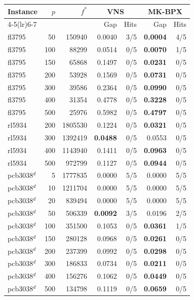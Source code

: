 \begin{tabular}{lrrrrrr}
\toprule
Instance & $p$ & $f^*$ & \multicolumn{2}{c}{VNS} & \multicolumn{2}{c}{MK-BPX} \\
\cmidrule(lr){4-5}\cmidrule(lr){6-7}
 & &  & Gap & Hits & Gap & Hits \\
\midrule
fl3795 & 50 & 150940 & 0.0040 & 3/5 & \textbf{0.0004} & 4/5 \\
fl3795 & 100 & 88299 & 0.0514 & 0/5 & \textbf{0.0070} & 1/5 \\
fl3795 & 150 & 65868 & 0.1497 & 0/5 & \textbf{0.0231} & 0/5 \\
fl3795 & 200 & 53928 & 0.1569 & 0/5 & \textbf{0.0731} & 0/5 \\
fl3795 & 300 & 39586 & 0.2364 & 0/5 & \textbf{0.0990} & 0/5 \\
fl3795 & 400 & 31354 & 0.4778 & 0/5 & \textbf{0.3228} & 0/5 \\
fl3795 & 500 & 25976 & 0.5982 & 0/5 & \textbf{0.4797} & 0/5 \\
\addlinespace[2pt]
rl5934 & 200 & 1805530 & 0.1224 & 0/5 & \textbf{0.0321} & 0/5 \\
rl5934 & 300 & 1392419 & \textbf{0.0488} & 0/5 & 0.0553 & 0/5 \\
rl5934 & 400 & 1143940 & 0.1411 & 0/5 & \textbf{0.0963} & 0/5 \\
rl5934 & 500 & 972799 & 0.1127 & 0/5 & \textbf{0.0944} & 0/5 \\
\addlinespace[2pt]
pcb3038$^{d}$ & 5 & 1777835 & 0.0000 & 5/5 & 0.0000 & 5/5 \\
pcb3038$^{d}$ & 10 & 1211704 & 0.0000 & 5/5 & 0.0000 & 5/5 \\
pcb3038$^{d}$ & 20 & 839494 & 0.0000 & 5/5 & 0.0000 & 5/5 \\
pcb3038$^{d}$ & 50 & 506339 & \textbf{0.0092} & 3/5 & 0.0196 & 2/5 \\
pcb3038$^{d}$ & 100 & 351500 & 0.1053 & 0/5 & \textbf{0.0361} & 1/5 \\
pcb3038$^{d}$ & 150 & 280128 & 0.0968 & 0/5 & \textbf{0.0261} & 0/5 \\
pcb3038$^{d}$ & 200 & 237399 & 0.0992 & 0/5 & \textbf{0.0298} & 0/5 \\
pcb3038$^{d}$ & 300 & 186833 & 0.0734 & 0/5 & \textbf{0.0211} & 0/5 \\
pcb3038$^{d}$ & 400 & 156276 & 0.1062 & 0/5 & \textbf{0.0449} & 0/5 \\
pcb3038$^{d}$ & 500 & 134798 & 0.1119 & 0/5 & \textbf{0.0659} & 0/5 \\
\bottomrule
\end{tabular}